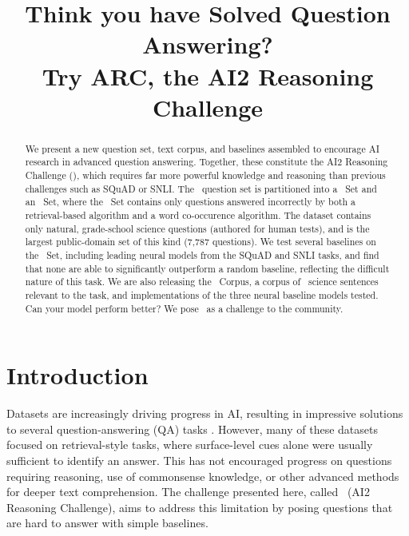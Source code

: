 \title{Think you have Solved Question Answering?\\
Try ARC, the AI2 Reasoning Challenge}



\maketitle

\begin{abstract}
We present a new question set, text corpus, and baselines assembled to encourage AI research in
advanced question answering.  Together, these constitute the AI2 Reasoning
Challenge (\ASC), which requires far more powerful knowledge and
reasoning than previous challenges such as SQuAD or SNLI.
The \ASC\  question set is partitioned into a \Challenge~Set and an \Additional~Set, where the \Challenge~Set
contains only questions answered incorrectly by both
a retrieval-based algorithm and a word co-occurence algorithm.
The dataset contains only natural, grade-school science questions (authored for human tests),
and is the largest public-domain set of this kind (7,787 questions).
We test several baselines on the \Challenge~Set, including leading neural
models from the SQuAD and SNLI tasks, and find that none are
able to significantly outperform a random baseline, reflecting the
difficult nature of this task. We are also releasing the \ASC~Corpus, a corpus
of \BUSCSIZE~science sentences relevant to the task, and implementations
of the three neural baseline models tested. Can your model perform
better? We pose \ASC~as a challenge to the community.
\end{abstract}

\section{Introduction}

Datasets are increasingly driving progress in AI, resulting in impressive solutions
to several question-answering (QA) tasks \cite[e.g.,][]{rajpurkar2016squad,JoshiTriviaQA2017}.
However, many of these datasets focused on retrieval-style tasks, where
surface-level cues alone were usually sufficient to identify an answer.
This has not encouraged progress on questions requiring reasoning, use of commonsense
knowledge, or other advanced methods for deeper text comprehension.
The challenge presented here, called \ASC~(AI2
Reasoning Challenge), aims to address this limitation by posing questions
that are hard to answer with simple baselines.

